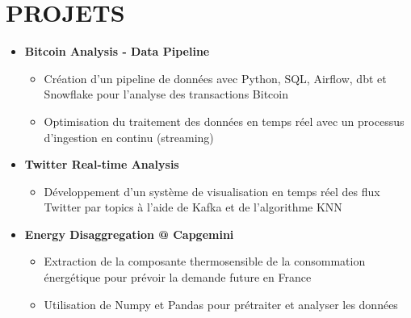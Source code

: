 \documentclass[letterpaper,11pt]{article}
\newcommand{\resumeItem}[1]{
  \item\small{
    {#1 \vspace{-1pt}}
  }
}
\newcommand{\resumeProjectHeading}[2]{
  \item
  {#1} \hfill {#2}
}
\newcommand{\resumeSubHeadingListStart}{\begin{itemize}[leftmargin=0in, label={}]}
\newcommand{\resumeSubHeadingListEnd}{\end{itemize}}
\newcommand{\resumeItemListStart}{\begin{itemize}[label={\textbullet}]}
\newcommand{\resumeItemListEnd}{\end{itemize}\vspace{0pt}}
\begin{document}
\section{PROJETS}
\resumeSubHeadingListStart
    \resumeProjectHeading
      {\textbf{Bitcoin Analysis - Data Pipeline}} {}
      \resumeItemListStart
        \resumeItem{Création d'un pipeline de données avec Python, SQL, Airflow, dbt et Snowflake pour l'analyse des transactions Bitcoin}
        \resumeItem{Optimisation du traitement des données en temps réel avec un processus d'ingestion en continu (streaming)}
      \resumeItemListEnd
    \resumeProjectHeading
      {\textbf{Twitter Real-time Analysis}} {}
      \resumeItemListStart
        \resumeItem{Développement d'un système de visualisation en temps réel des flux Twitter par topics à l'aide de Kafka et de l'algorithme KNN}
      \resumeItemListEnd
    \resumeProjectHeading
      {\textbf{Energy Disaggregation @ Capgemini}} {}
      \resumeItemListStart
        \resumeItem{Extraction de la composante thermosensible de la consommation énergétique pour prévoir la demande future en France}
        \resumeItem{Utilisation de Numpy et Pandas pour prétraiter et analyser les données}
      \resumeItemListEnd
\resumeSubHeadingListEnd
\end{document}
